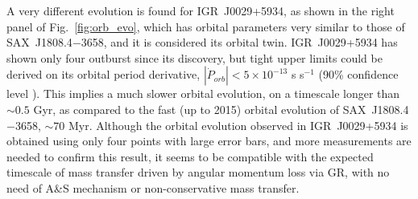 \documentclass[graybox]{svmult}
\def \saxj{{\rm SAX~J1808.4$-$3658\xspace}}
\begin{document}
A very different evolution is found for IGR~J0029+5934, as shown in the right panel of Fig.~\ref{fig:orb_evo}, which has orbital parameters very similar to those of \saxj{}, and it is considered its orbital twin. IGR~J0029+5934 has shown only four outburst since its discovery, but tight upper limits could be derived on its orbital period derivative, $|\dot P_{orb}| < 5 \times 10^{-13}$ s s$^{-1}$ (90\% confidence level \cite{Patruno2017,Sanna2017d}). This implies a much slower orbital evolution, on a timescale longer than $\sim 0.5$ Gyr, as compared to the fast (up to 2015) orbital evolution of \saxj{}, $\sim 70$ Myr. Although the orbital evolution observed in IGR~J0029+5934 is obtained using only four points with large error bars, and more measurements are needed to confirm this result, it seems to be compatible with the expected timescale of mass transfer driven by angular momentum loss via GR, with no need of A\&S mechanism or non-conservative mass transfer. 
\end{document}
